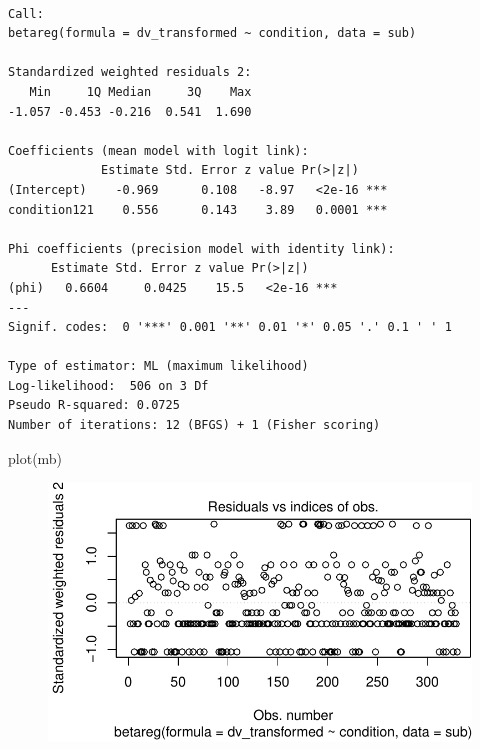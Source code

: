 \documentclass[
  letterpaper,
  DIV=11,
  numbers=noendperiod]{scrreprt}
\newenvironment{Shaded}{\begin{snugshade}}{\end{snugshade}}
\newcommand{\FunctionTok}[1]{\textcolor[rgb]{0.28,0.35,0.67}{#1}}
\newcommand{\NormalTok}[1]{\textcolor[rgb]{0.00,0.23,0.31}{#1}}
\begin{document}
\begin{verbatim}

Call:
betareg(formula = dv_transformed ~ condition, data = sub)

Standardized weighted residuals 2:
   Min     1Q Median     3Q    Max 
-1.057 -0.453 -0.216  0.541  1.690 

Coefficients (mean model with logit link):
             Estimate Std. Error z value Pr(>|z|)    
(Intercept)    -0.969      0.108   -8.97   <2e-16 ***
condition121    0.556      0.143    3.89   0.0001 ***

Phi coefficients (precision model with identity link):
      Estimate Std. Error z value Pr(>|z|)    
(phi)   0.6604     0.0425    15.5   <2e-16 ***
---
Signif. codes:  0 '***' 0.001 '**' 0.01 '*' 0.05 '.' 0.1 ' ' 1 

Type of estimator: ML (maximum likelihood)
Log-likelihood:  506 on 3 Df
Pseudo R-squared: 0.0725
Number of iterations: 12 (BFGS) + 1 (Fisher scoring) 
\end{verbatim}

\begin{Shaded}
\begin{Highlighting}[]
\FunctionTok{plot}\NormalTok{(mb)}
\end{Highlighting}
\end{Shaded}

\begin{figure}[H]

{\centering \includegraphics{analysis/SGC3A/4_sgc3A_hypotesting_files/figure-pdf/unnamed-chunk-3-3.pdf}

}

\end{figure}
\end{document}
